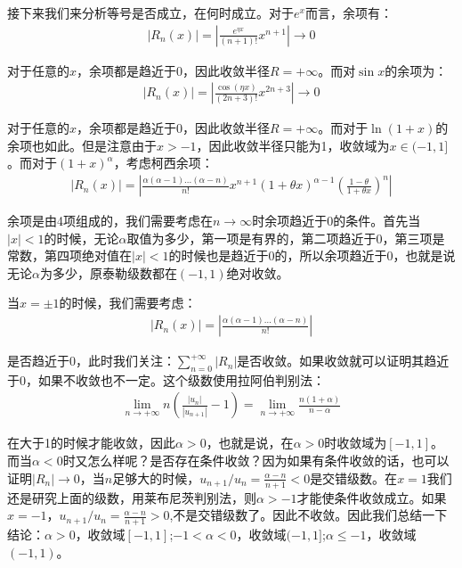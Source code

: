 \documentclass{ctexart}
\begin{document}
接下来我们来分析等号是否成立，在何时成立。对于$e^x$而言，余项有：
\begin{align*}
  |R_n(x)|=|\frac{e^{\eta x}}{(n+1)!}x^{n+1}|\to 0    
\end{align*}

对于任意的$x$，余项都是趋近于0，因此收敛半径$R=+\infty$。而对$\sin x$的余项为：
\begin{align*}
  |R_n(x)|=|\frac{\cos(\eta x)}{(2n+3)!}x^{2n+3}|\to 0    
\end{align*}

对于任意的$x$，余项都是趋近于0，因此收敛半径$R=+\infty$。而对于$\ln(1+x)$的余项也如此。但是注意由于$x>-1$，因此收敛半径只能为1，收敛域为$x\in(-1,1]$。而对于$(1+x)^\alpha$，考虑\colorbox{pink!30!white}柯西余项：
\begin{align*}
  |R_n(x)|=\left|\frac{\alpha(\alpha-1)...(\alpha-n)}{n!}x^{n+1}(1+\theta x)^{\alpha-1}
\left(\frac{1-\theta}{1+\theta x} \right)^n \right|
\end{align*}

余项是由4项组成的，我们需要考虑在$n\to\infty$时余项趋近于0的条件。首先当$|x|<1$的时候，无论$\alpha$取值为多少，第一项是有界的，第二项趋近于0，第三项是常数，第四项绝对值在$|x|<1$的时候也是趋近于0的，所以余项趋近于0，也就是说无论$\alpha$为多少，原泰勒级数都在$(-1,1)$绝对收敛。

当$x=\pm 1$的时候，我们需要考虑：
\begin{align*}
  |R_n(x)|=\left|\frac{\alpha(\alpha-1)...(\alpha-n)}{n!}\right|
\end{align*}

是否趋近于0，此时我们关注：$\sum_{n=0}^{+\infty} 
|R_n|$是否收敛。如果收敛就可以证明其趋近于0，如果不收敛也不一定。这个级数使用\colorbox{pink!30!white}拉阿伯判别法：
\begin{align*}
    \lim_{n\to+\infty}n\left(\frac{|u_n|}{|u_{n+1}|}-1\right)=\lim_{n\to+\infty}\frac{n(1+\alpha)}{n-\alpha}
\end{align*}

在大于1的时候才能收敛，因此$\alpha>0$，也就是说，在$\alpha>0$时收敛域为$[-1,1]$。而当$\alpha<0$时又怎么样呢？是否存在条件收敛？因为如果有条件收敛的话，也可以证明$|R_n|\to0$，当$n$足够大的时候，$u_{n+1}/u_n=\frac{\alpha-n}{n+1}<0$是交错级数。在$x=1$我们还是研究上面的级数，用莱布尼茨判别法，则$\alpha>-1$才能使条件收敛成立。如果$x=-1$，$u_{n+1}/u_n=\frac{\alpha-n}{n+1}>0$,不是交错级数了。因此不收敛。因此我们总结一下结论：$\alpha>0$，收敛域$[-1,1]$;$-1<\alpha<0$，收敛域$(-1,1]$;$\alpha\leq -1$，收敛域$(-1,1)$。
\end{document}
